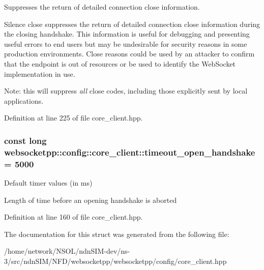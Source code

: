 Suppresses the return of detailed connection close information. 

Silence close suppresses the return of detailed connection close information during the closing handshake. This information is useful for debugging and presenting useful errors to end users but may be undesirable for security reasons in some production environments. Close reasons could be used by an attacker to confirm that the endpoint is out of resources or be used to identify the Web\+Socket implementation in use.

Note\+: this will suppress {\itshape all} close codes, including those explicitly sent by local applications. 

Definition at line 225 of file core\+\_\+client.\+hpp.

\subsubsection[{\texorpdfstring{timeout\+\_\+open\+\_\+handshake}{timeout\_open\_handshake}}]{\setlength{\rightskip}{0pt plus 5cm}const long websocketpp\+::config\+::core\+\_\+client\+::timeout\+\_\+open\+\_\+handshake = 5000\hspace{0.3cm}{\ttfamily [static]}}\hypertarget{structwebsocketpp_1_1config_1_1core__client_aad4057440517a8586c2dfebdbca0936c}{}\label{structwebsocketpp_1_1config_1_1core__client_aad4057440517a8586c2dfebdbca0936c}


Default timer values (in ms) 

Length of time before an opening handshake is aborted 

Definition at line 160 of file core\+\_\+client.\+hpp.



The documentation for this struct was generated from the following file\+:\begin{DoxyCompactItemize}
\item 
/home/network/\+N\+S\+O\+L/ndn\+S\+I\+M-\/dev/ns-\/3/src/ndn\+S\+I\+M/\+N\+F\+D/websocketpp/websocketpp/config/core\+\_\+client.\+hpp\end{DoxyCompactItemize}
